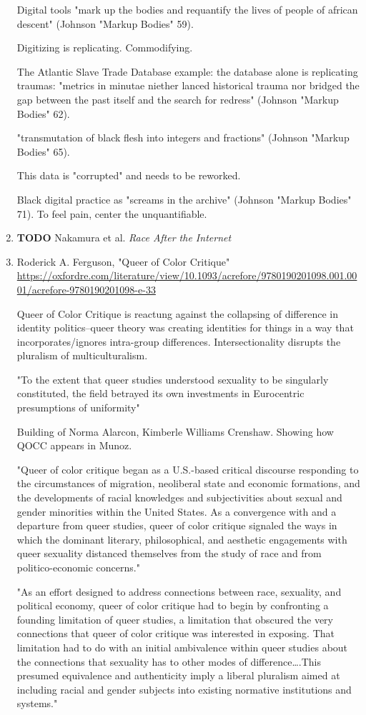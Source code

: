 \documentclass[11pt]{article}
\begin{document}
\begin{enumerate}
Digital tools "mark up the bodies and requantify the lives of people
of african descent" (Johnson "Markup Bodies" 59). 

Digitizing is replicating. Commodifying. 

The Atlantic Slave Trade Database example: the database alone is
replicating traumas: "metrics in minutae niether lanced historical
trauma nor bridged the gap between the past itself and the search for
redress" (Johnson "Markup Bodies" 62).

"transmutation of black flesh into integers and fractions" (Johnson
"Markup Bodies" 65). 

This data is "corrupted" and needs to be reworked. 

Black digital practice as "screams in the archive" (Johnson "Markup
Bodies" 71). To feel pain, center the unquantifiable. 

\item {\bfseries\sffamily TODO} Nakamura et al. \emph{Race After the Internet}
\label{sec:orga6e3ff3}
\item Roderick A. Ferguson, "Queer of Color Critique"
\label{sec:orgf5366ed}
\url{https://oxfordre.com/literature/view/10.1093/acrefore/9780190201098.001.0001/acrefore-9780190201098-e-33}

Queer of Color Critique is reactung against the collapsing of
difference in identity politics--queer theory was creating identities
for things in a way that incorporates/ignores intra-group
differences. Intersectionality disrupts the pluralism of
multiculturalism. 

"To the extent that queer studies understood sexuality to be singularly
constituted, the field betrayed its own investments in Eurocentric
presumptions of uniformity"

Building of Norma Alarcon, Kimberle Williams Crenshaw. Showing how
QOCC appears in Munoz.

"Queer of color critique began as a U.S.-based critical discourse
responding to the circumstances of migration, neoliberal state and
economic formations, and the developments of racial knowledges and
subjectivities about sexual and gender minorities within the United
States. As a convergence with and a departure from queer studies,
queer of color critique signaled the ways in which the dominant
literary, philosophical, and aesthetic engagements with queer
sexuality distanced themselves from the study of race and from
politico-economic concerns."

"As an effort designed to address connections between race, sexuality,
and political economy, queer of color critique had to begin by
confronting a founding limitation of queer studies, a limitation that
obscured the very connections that queer of color critique was
interested in exposing. That limitation had to do with an initial
ambivalence within queer studies about the connections that sexuality
has to other modes of difference\ldots{}.This presumed equivalence and
authenticity imply a liberal pluralism aimed at including racial and
gender subjects into existing normative institutions and systems."


\end{enumerate}
\end{document}
